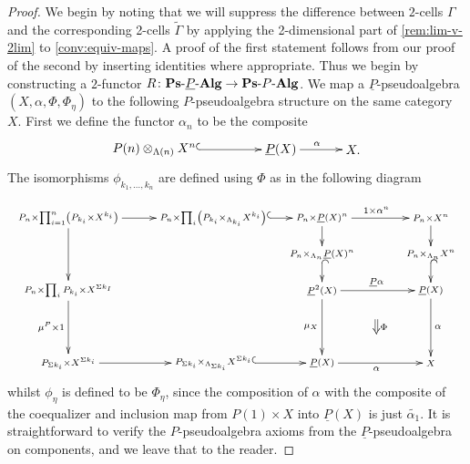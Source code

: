 \begin{proof}
We begin by noting that we will suppress the difference between $2$-cells $\Gamma$ and the corresponding 2-cells $\tilde{\Gamma}$ by applying the 2-dimensional part of \cref{rem:lim-v-2lim} to \cref{conv:equiv-maps}. 
A proof of the first statement follows from our proof of the second by inserting identities where appropriate. Thus we begin by constructing a $2$-functor $R \colon \mathbf{Ps}\mbox{-}\underline{P}\mbox{-}\mathbf{Alg} \rightarrow \mathbf{Ps}\mbox{-}P\mbox{-}\mathbf{Alg}$. We map a $\underline{P}$-pseudoalgebra $(X,\alpha,\Phi,\Phi_\eta)$ to the following $P$-pseudoalgebra structure on the same category $X$. First we define the functor $\alpha_n$ to be the composite
    \[
        \xy
            (0,0)*+{\coeq{P}{X}{\Lambda}{n}}="00";
            (35,0)*+{\underline{P}(X)}="10";
            (55,0)*+{X.}="20";
            {\ar@{^{(}->} "00" ; "10"};
            {\ar^{\alpha} "10" ; "20"};
        \endxy
    \]
The isomorphisms $\phi_{k_1,\ldots,k_n}$ are defined using $\Phi$ as in the following diagram

    \[
        \xy
            (-10,0)*+{\scriptstyle P_n \times \prod_{i=1}^n\left(P_{k_i} \times X^{k_i}\right)}="00";
            (30,0)*+{\scriptstyle P_n \times \prod_i \left( P_{k_i} \times_{\Lambda_{k_i}} X^{k_i} \right)}="10";
            (60,0)*+{\scriptstyle P_n \times \underline{P}(X)^n}="20";
            (90,0)*+{\scriptstyle P_n \times X^n}="30";
            (-10,-20)*+{\scriptstyle P_n \times \prod_{i} P_{k_i} \times X^{\Sigma k_I}}="01";
            (-10,-40)*+{\scriptstyle P_{\Sigma k_i} \times X^{\Sigma k_{i}}}="02";
            (60,-10)*+{\scriptstyle P_n \times_{\Lambda_n} \underline{P}(X)^n}="21";
            (60,-20)*+{\scriptstyle \underline{P}^2(X)}="22";
            (90,-10)*+{\scriptstyle P_n \times_{\Lambda_n} X^n}="31";
            (90,-20)*+{\scriptstyle \underline{P}(X)}="32";
            (30,-40)*+{\scriptstyle P_{\Sigma k_i} \times_{\Lambda_{\Sigma k_i}} X^{\Sigma k_i}}="12";
            (60,-40)*+{\scriptstyle \underline{P}(X)}="23";
            (90,-40)*+{\scriptstyle X}="33";
            {\ar "00" ; "10"};
            {\ar "00" ; "01"};
            {\ar_{\mu^P \times 1} "01" ; "02"};
            {\ar@{^{(}->} "10" ; "20"};
            {\ar "20" ; "21"};
            {\ar^{1 \times \alpha^n} "20" ; "30"};
            {\ar "30" ; "31"};
            {\ar@{^{(}->} "21" ; "22"};
            {\ar^{\underline{P}\alpha} "22" ; "32"};
            {\ar@{^{(}->} "31" ; "32"};
            {\ar_{\mu_X} "22" ; "23"};
            {\ar_{\alpha} "23" ; "33"};
            {\ar^{\alpha} "32" ; "33"};
            {\ar "02" ; "12"};
            {\ar@{^{(}->} "12" ; "23"};
            {\ar@{=>}^{\Phi} (75,-28) ; (75,-32)};
        \endxy
    \]
\noindent whilst $\phi_\eta$ is defined to be $\Phi_{\eta}$, since the composition of $\alpha$ with the composite of the coequalizer and inclusion map from $P(1) \times X$ into $\underline{P}(X)$ is just $\tilde{\alpha_1}$. 
It is straightforward to verify the $P$-pseudoalgebra axioms from the $\underline{P}$-pseudoalgebra on components, and we leave that to the reader.


\end{proof}
